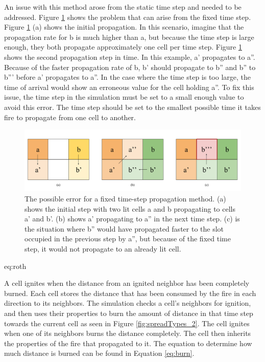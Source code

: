 An issue with this method arose from the static time step and needed to be addressed. Figure \ref{fig:accerr} shows the problem that can arise from the fixed time step. Figure \ref{fig:accerr} (a) shows the initial propagation. In this scenario, imagine that the propagation rate for b is much higher than a, but because the time step is large enough, they both propagate approximately one cell per time step. Figure \ref{fig:accerr} shows the second propagation step in time. In this example, a' propagates to a''. Because of the faster propagation rate of b, b' should propagate to b'' and b'' to b''' before a' propagates to a''. In the case where the time step is too large, the time of arrival would show an erroneous value for the cell holding a''. To fix this issue, the time step in the simulation must be set to a small enough value to avoid this error. The time step should be set to the smallest possible time it takes fire to propagate from one cell to another. 

\begin{figure}
\centering
  \includegraphics[width=\linewidth]{figures/implementation/Acceleration_error.png}
  \caption{The possible error for a fixed time-step propagation method. (a) shows the initial step with two lit cells a and b propagating to cells a' and b'. (b) shows a' propagating to a'' in the next time step. (c) is the situation where b'' would have propagated faster to the slot occupied in the previous step by a'', but because of the fixed time step, it would not propagate to an already lit cell.}
  \label{fig:accerr}
\end{figure}eq:roth

A cell ignites when the distance from an ignited neighbor has been completely burned. Each cell stores the distance that has been consumed by the fire in each direction to its neighbors. The simulation checks a cell's neighbors for ignition, and then uses their properties to burn the amount of distance in that time step towards the current cell as seen in Figure \ref{fig:spreadTypes_2}. The cell ignites when one of its neighbors burns the distance completely. The cell then inherits the properties of the fire that propagated to it. The equation to determine how much distance is burned can be found in Equation \ref{eq:burn}. 

